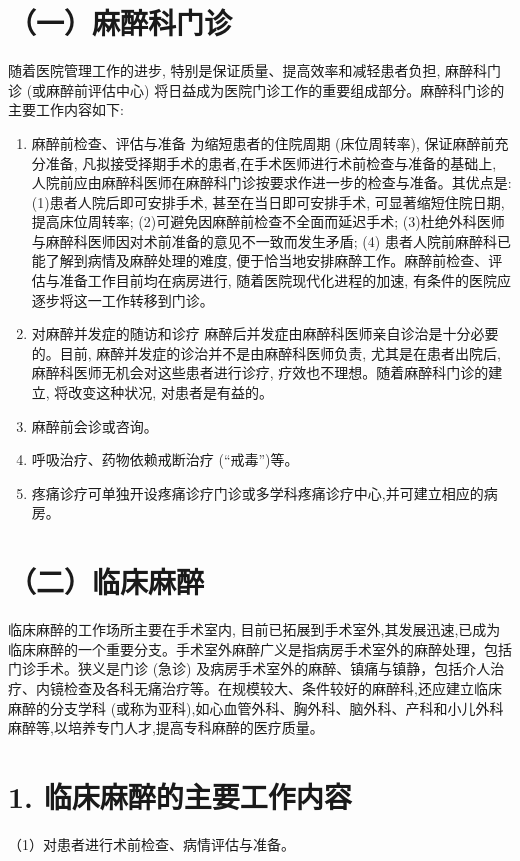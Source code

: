 \documentclass[10pt]{article}
\begin{document}
\section*{（一）麻醉科门诊}
随着医院管理工作的进步, 特别是保证质量、提高效率和减轻患者负担, 麻醉科门诊 (或麻醉前评估中心) 将日益成为医院门诊工作的重要组成部分。麻醉科门诊的主要工作内容如下:

\begin{enumerate}
  \item 麻醉前检查、评估与准备 为缩短患者的住院周期 (床位周转率), 保证麻醉前充分准备, 凡拟接受择期手术的患者,在手术医师进行术前检查与准备的基础上, 人院前应由麻醉科医师在麻醉科门诊按要求作进一步的检查与准备。其优点是: (1)患者人院后即可安排手术, 甚至在当日即可安排手术, 可显著缩短住院日期, 提高床位周转率; (2)可避免因麻醉前检查不全面而延迟手术; (3)杜绝外科医师与麻醉科医师因对术前准备的意见不一致而发生矛盾; (4) 患者人院前麻醉科已能了解到病情及麻醉处理的难度, 便于恰当地安排麻醉工作。麻醉前检查、评估与准备工作目前均在病房进行, 随着医院现代化进程的加速, 有条件的医院应逐步将这一工作转移到门诊。

  \item 对麻醉并发症的随访和诊疗 麻醉后并发症由麻醉科医师亲自诊治是十分必要的。目前, 麻醉并发症的诊治并不是由麻醉科医师负责, 尤其是在患者出院后, 麻醉科医师无机会对这些患者进行诊疗, 疗效也不理想。随着麻醉科门诊的建立, 将改变这种状况, 对患者是有益的。

  \item 麻醉前会诊或咨询。

  \item 呼吸治疗、药物依赖戒断治疗 (“戒毒”)等。

  \item 疼痛诊疗可单独开设疼痛诊疗门诊或多学科疼痛诊疗中心,并可建立相应的病房。

\end{enumerate}

\section*{（二）临床麻醉}
临床麻醉的工作场所主要在手术室内, 目前已拓展到手术室外,其发展迅速,已成为临床麻醉的一个重要分支。手术室外麻醉广义是指病房手术室外的麻醉处理，包括门诊手术。狭义是门诊 (急诊) 及病房手术室外的麻醉、镇痛与镇静，包括介人治疗、内镜检查及各科无痛治疗等。在规模较大、条件较好的麻醉科,还应建立临床麻醉的分支学科 (或称为亚科),如心血管外科、胸外科、脑外科、产科和小儿外科麻醉等,以培养专门人才,提高专科麻醉的医疗质量。

\section*{1. 临床麻醉的主要工作内容}
（1）对患者进行术前检查、病情评估与准备。
\end{document}
